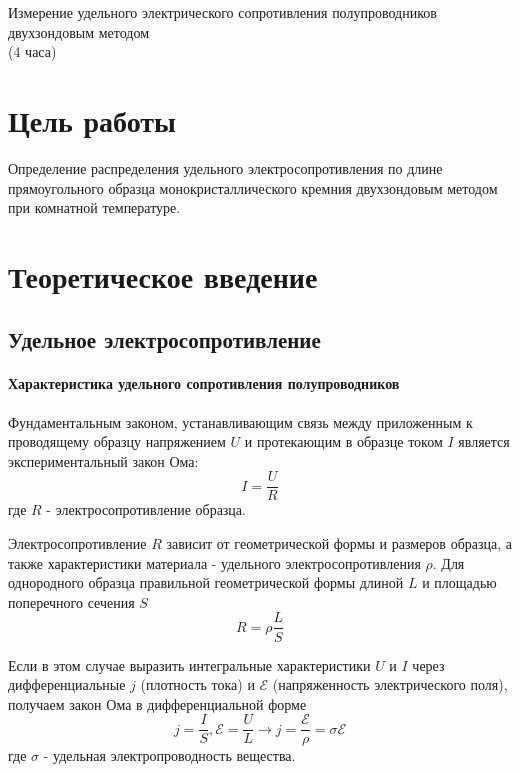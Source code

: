 \newpage

\setcounter{chapter}{1}
\setcounter{section}{0}
\setcounter{figure}{0}
\setcounter{table}{0}
\setcounter{equation}{0}

\begin{center}
Измерение удельного электрического сопротивления полупроводников двухзондовым методом\\
(4 часа)
\end{center}

\section{Цель работы}
Определение распределения удельного электросопротивления по длине прямоугольного образца монокристаллического кремния двухзондовым методом при комнатной температуре.

\section{Теоретическое введение}
\subsection{Удельное электросопротивление}
\paragraph{Характеристика удельного сопротивления полупроводников}

Фундаментальным законом, устанавливающим связь между приложенным к проводящему образцу напряжением $U$ и протекающим в образце током $I$ является экспериментальный закон Ома:
\begin{equation}
I = \frac{U}{R}
\end{equation}
где $R$ - электросопротивление образца.

Электросопротивление $R$ зависит от геометрической формы и размеров образца, а также характеристики материала - удельного электросопротивления $\rho$. Для однородного образца правильной геометрической формы длиной $L$ и площадью поперечного сечения $S$
\begin{equation}
R = \rho \frac{L}{S}
\end{equation}

Если в этом случае выразить интегральные характеристики $U$ и $I$ через дифференциальные $j$ (плотность тока) и $\mathcal{E}$ (напряженность электрического поля), получаем закон Ома в дифференциальной форме
\begin{equation}
j = \frac{I}{S}, \mathcal{E} = \frac{U}{L} \rightarrow j = \frac{\mathcal{E}}{\rho} = \sigma \mathcal{E}
\end{equation}
где $\sigma$ - удельная электропроводность вещества.

